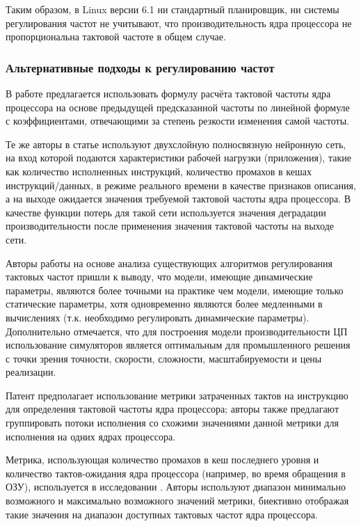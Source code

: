     Таким образом, в Linux версии 6.1 ни стандартный планировщик, ни системы регулирования частот
    не учитывают, что производительность ядра процессора не пропорциональна тактовой частоте
    в общем случае.

\subsubsection{Альтернативные подходы к регулированию частот}

    В работе \cite{liang2013performance} предлагается использовать формулу расчёта тактовой частоты
    ядра процессора на основе предыдущей предсказанной частоты по линейной формуле с коэффициентами,
    отвечающими за степень резкости изменения самой частоты.

    Те же авторы в статье
    \cite{chen2018learning} используют двухслойную полносвязную нейронную сеть, на вход которой
    подаются характеристики рабочей нагрузки (приложения), такие как количество исполненных инструкций,
    количество промахов в кешах инструкций/данных, в режиме реального времени в качестве
    признаков описания, а на выходе ожидается значения требуемой тактовой частоты ядра процессора.
    В качестве функции потерь для такой сети используется значения деградации производительности после
    применения значения тактовой частоты на выходе сети. %

    Авторы работы \cite{haririan2020dvfs} на основе анализа существующих алгоритмов регулирования
    тактовых частот пришли к выводу, что модели, имеющие динамические параметры, являются более точными
    на практике чем модели, имеющие только статические параметры, хотя одновременно являются более
    медленными в вычислениях (т.к. необходимо регулировать динамические параметры). Дополнительно
    отмечается, что для построения модели производительности ЦП использование симуляторов является
    оптимальным для промышленного решения с точки зрения точности, скорости, сложности,
    масштабируемости и цены реализации.

    Патент \cite{johnson2012frequency} предполагает использование метрики затраченных тактов на
    инструкцию для определения тактовой частоты ядра процессора; авторы также предлагают
    группировать потоки исполнения со схожими значениями данной метрики для исполнения на
    одних ядрах процессора.

    Метрика, использующая количество промахов в кеш последнего уровня и количество тактов-ожидания
    ядра процессора (например, во время обращения в ОЗУ), используется в исследовании \cite{hebbar2022pmu}.
    Авторы используют диапазон минимально возможного и максимально возможного значений метрики,
    биективно отображая такие значения на диапазон доступных тактовых частот ядра процессора.

